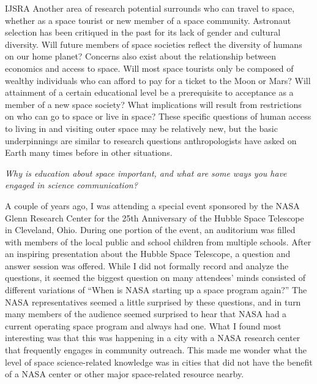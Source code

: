 \begin{labeling}{IJSRA}
	Another area of research potential surrounds who can travel to space, whether as a space tourist or new member of a space community. Astronaut selection has been critiqued in the past for its lack of gender and cultural diversity. Will future members of space societies reflect the diversity of humans on our home planet? Concerns also exist about the relationship between economics and access to space. Will most space tourists only be composed of wealthy individuals who can afford to pay for a ticket to the Moon or Mars? Will attainment of a certain educational level be a prerequisite to acceptance as a member of a new space society? What implications will result from restrictions on who can go to space or live in space? These specific questions of human access to living in and visiting outer space may be relatively new, but the basic underpinnings are similar to research questions anthropologists have asked on Earth many times before in other situations.

	\item[IJSRA] \emph{Why is education about space important, and what are some ways you have engaged in science communication?}

	\item[KS] A couple of years ago, I was attending a special event sponsored by the NASA Glenn Research Center for the 25th Anniversary of the Hubble Space Telescope in Cleveland, Ohio. During one portion of the event, an auditorium was filled with members of the local public and school children from multiple schools. After an inspiring presentation about the Hubble Space Telescope, a question and answer session was offered. While I did not formally record and analyze the questions, it seemed the biggest question on many attendees’ minds consisted of different variations of “When is NASA starting up a space program again?” The NASA representatives seemed a little surprised by these questions, and in turn many members of the audience seemed surprised to hear that NASA had a current operating space program and always had one. What I found most interesting was that this was happening in a city with a NASA research center that frequently engages in community outreach. This made me wonder what the level of space science-related knowledge was in cities that did not have the benefit of a NASA center or other major space-related resource nearby.


\end{labeling}
